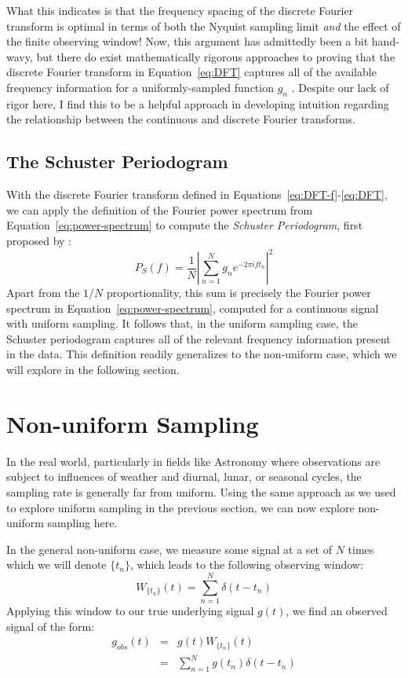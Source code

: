 \documentclass[preprint]{aastex}
\newcommand{\Eq}[1]{Equation~\ref{eq:#1}}
\newcommand{\eq}[1]{\Eq{#1}}
\newcommand{\eqs}[2]{Equations~\ref{eq:#1}-\ref{eq:#2}}
\newcommand{\eqlabel}[1]{\label{eq:#1}}
\newcommand{\sectlabel}[1]{\label{sect:#1}}
\begin{document}
What this indicates is that the frequency spacing of the discrete Fourier
transform is optimal in terms of both the Nyquist sampling limit
{\it and} the effect of the finite observing window!
Now, this argument has admittedly been a bit hand-wavy, but there do exist
mathematically rigorous approaches to proving that the discrete Fourier
transform in \eq{DFT} captures all of the available frequency information
for a uniformly-sampled function $g_n$
\citep[see, e.g.][]{FoundationsOfSignalProcessing}.
Despite our lack of rigor here, I find this to be a helpful approach
in developing intuition regarding the relationship between the
continuous and discrete Fourier transforms.

\subsection{The Schuster Periodogram}

With the discrete Fourier transform defined in \eqs{DFT-f}{DFT}, we can
apply the definition of the Fourier power spectrum from \eq{power-spectrum}
to compute the {\it Schuster Periodogram}, first proposed by \citet{Schuster98}:
\begin{equation}
  P_S(f) = \frac{1}{N}\left|\sum_{n=1}^N g_n e^{-2\pi i f t_n}\right|^2
  \eqlabel{schuster-periodogram}
\end{equation}
Apart from the $1/N$ proportionality, this sum is precisely the Fourier power
spectrum in \eq{power-spectrum}, computed for a continuous signal with
uniform sampling.
It follows that, in the uniform sampling case, the Schuster periodogram
captures all of the relevant frequency information present in the data.
This definition readily generalizes to the non-uniform case, which we
will explore in the following section.


\section{Non-uniform Sampling}
\sectlabel{non-uniform-sampling}

In the real world, particularly in fields like Astronomy where observations are
subject to influences of weather and diurnal, lunar, or seasonal cycles, the
sampling rate is generally far from uniform.
Using the same approach as we used to explore uniform sampling in the previous
section, we can now explore non-uniform sampling here.

In the general non-uniform case, we measure some signal at a set of $N$ times
which we will denote $\{t_n\}$, which leads to the following observing window:
\begin{equation}
  W_{\{t_n\}}(t) = \sum_{n=1}^{N} \delta(t - t_n)
  \eqlabel{nonuniform-window}
\end{equation}
Applying this window to our true underlying signal $g(t)$, we find an observed
signal of the form:
\begin{eqnarray}
  g_{obs}(t) &=& g(t) W_{\{t_n\}}(t) \nonumber\\
             &=& \sum_{n=1}^{N} g(t_n)\delta(t - t_n)
  \eqlabel{g-nonuniform}
\end{eqnarray}
\end{document}
